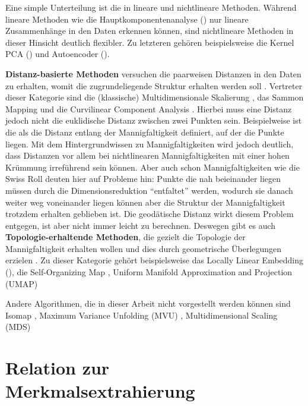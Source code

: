 Eine simple Unterteilung ist die in lineare und nichtlineare Methoden. Während lineare Methoden wie
die Hauptkomponentenanalyse () nur lineare
Zusammenhänge in den Daten erkennen können, sind nichtlineare Methoden in dieser Hinsicht deutlich
flexibler. Zu letzteren gehören beispielsweise die Kernel PCA
() und Autoencoder
().

\textbf{Distanz-basierte Methoden} versuchen die paarweisen Distanzen in den Daten zu erhalten, womit die zugrundeliegende Struktur erhalten werden soll \parencite[3]{Gracia.2014}. Vertreter dieser Kategorie sind die (klassische) Multidimensionale
Skalierung \parencites{Kruskal.1964}{Cox.2008}, das Sammon Mapping \addref und die Curvilinear Component Analysis
\addref. Hierbei muss eine Distanz jedoch nicht die euklidische Distanz zwischen zwei Punkten sein.
Beispielweise ist die  als die Distanz entlang der Mannigfaltigkeit
definiert, auf der die Punkte liegen. Mit dem Hintergrundwissen zu Mannigfaltigkeiten wird jedoch
deutlich, dass Distanzen vor allem bei nichtlinearen Mannigfaltigkeiten mit einer hohen Krümmung
irreführend sein können. Aber auch schon Mannigfaltigkeiten wie die Swiss Roll deuten hier auf
Probleme hin: Punkte die nah beieinander liegen müssen durch die Dimensionsreduktion
\enquote{entfaltet} werden, wodurch sie danach weiter weg voneinander liegen können aber die
Struktur der Mannigfaltigkeit trotzdem erhalten geblieben ist. Die geodätische Distanz wirkt diesem
Problem entgegen, ist aber nicht immer leicht zu berechnen. Deswegen gibt es auch
\textbf{Topologie-erhaltende Methoden}, die gezielt die Topologie der Mannigfaltigkeit erhalten
wollen und dies durch geometrische Überlegungen erzielen \parencite[4]{Gracia.2014}. Zu dieser Kategorie gehört beispielsweise das Locally Linear Embedding
(), die Self-Organizing Map \parencite{Kohonen.1990}, Uniform Manifold Approximation and Projection (UMAP)%

Andere Algorithmen, die in dieser Arbeit nicht vorgestellt werden können sind Isomap \parencite{Tenenbaum.2000}, Maximum Variance Unfolding (MVU) \parencite{Weinberger.2006}, Multidimensional Scaling (MDS) \parencites{Kruskal.1964}{Cox.2008}

\section{Relation zur Merkmalsextrahierung}
\label{ch:Dimensionsreduktion:Merkmalsextrahierung}

